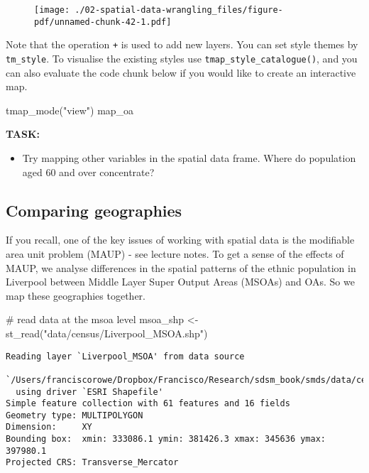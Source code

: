 \documentclass[
  letterpaper,
  krantz2]{style/krantz}
\newenvironment{Shaded}{\begin{snugshade}}{\end{snugshade}}
\newcommand{\CommentTok}[1]{\textcolor[rgb]{0.37,0.37,0.37}{#1}}
\newcommand{\FunctionTok}[1]{\textcolor[rgb]{0.28,0.35,0.67}{#1}}
\newcommand{\NormalTok}[1]{\textcolor[rgb]{0.00,0.23,0.31}{#1}}
\newcommand{\OtherTok}[1]{\textcolor[rgb]{0.00,0.23,0.31}{#1}}
\newcommand{\StringTok}[1]{\textcolor[rgb]{0.13,0.47,0.30}{#1}}
\providecommand{\tightlist}{%
  \setlength{\itemsep}{0pt}\setlength{\parskip}{0pt}}\usepackage{longtable,booktabs,array}
\begin{document}
\begin{figure}[H]

{\centering \texttt{[image: ./02-spatial-data-wrangling\_files/figure-pdf/unnamed-chunk-42-1.pdf]}

}

\end{figure}

Note that the operation \texttt{+} is used to add new layers. You can
set style themes by \texttt{tm\_style}. To visualise the existing styles
use \texttt{tmap\_style\_catalogue()}, and you can also evaluate the
code chunk below if you would like to create an interactive map.

\begin{Shaded}
\begin{Highlighting}[]
\FunctionTok{tmap\_mode}\NormalTok{(}\StringTok{"view"}\NormalTok{)}
\NormalTok{map\_oa}
\end{Highlighting}
\end{Shaded}

\textbf{TASK:}

\begin{itemize}
\tightlist
\item
  Try mapping other variables in the spatial data frame. Where do
  population aged 60 and over concentrate?
\end{itemize}

\hypertarget{comparing-geographies}{%
\subsection{Comparing geographies}\label{comparing-geographies}}

If you recall, one of the key issues of working with spatial data is the
modifiable area unit problem (MAUP) - see lecture notes. To get a sense
of the effects of MAUP, we analyse differences in the spatial patterns
of the ethnic population in Liverpool between Middle Layer Super Output
Areas (MSOAs) and OAs. So we map these geographies together.

\begin{Shaded}
\begin{Highlighting}[]
\CommentTok{\# read data at the msoa level}
\NormalTok{msoa\_shp }\OtherTok{\textless{}{-}} \FunctionTok{st\_read}\NormalTok{(}\StringTok{"data/census/Liverpool\_MSOA.shp"}\NormalTok{)}
\end{Highlighting}
\end{Shaded}

\begin{verbatim}
Reading layer `Liverpool_MSOA' from data source 
  `/Users/franciscorowe/Dropbox/Francisco/Research/sdsm_book/smds/data/census/Liverpool_MSOA.shp' 
  using driver `ESRI Shapefile'
Simple feature collection with 61 features and 16 fields
Geometry type: MULTIPOLYGON
Dimension:     XY
Bounding box:  xmin: 333086.1 ymin: 381426.3 xmax: 345636 ymax: 397980.1
Projected CRS: Transverse_Mercator
\end{verbatim}
\end{document}
